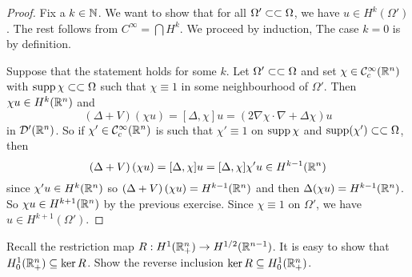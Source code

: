 \begin{proof}
  Fix a $k\in\mathbb{N}$.
  We want to show that for all $\Omega'\subset\subset\Omega$, we have $u\in H^k(\Omega')$.
  The rest follows from $C^\infty=\bigcap H^k$.
  We proceed by induction,
  The case $k=0$ is by definition.

  Suppose that the statement holds for some $k$.
  Let $\Omega'\subset\subset\Omega$ and set $\chi\in\mathcal{C}_c^\infty(\mathbb{R}^n)$ with $\operatorname{supp}\chi\subset\subset\Omega$ such that $\chi\equiv1$ in some neighbourhood of $\Omega'$.
  Then $\chi u\in H^k(\mathbb{R}^n)$ and
  \[ \left( \Delta+V \right)(\chi u) = [\Delta,\chi]u = \left( 2\nabla\chi\cdot\nabla+\Delta\chi \right)u \]
  in $\mathcal{D}'(\mathbb{R}^n)$.
  So if $\chi'\in\mathcal{C}_c^\infty(\mathbb{R}^n)$ is such that $\chi'\equiv1$ on $\operatorname{supp}\chi$ and $\operatorname{supp}(\chi')\subset\subset\Omega$, then
  \[ \left( \Delta+V \right)(\chi u) = [\Delta,\chi]u = [\Delta,\chi]\chi'u \in H^{k-1}(\mathbb{R}^n) \]
  since $\chi'u\in H^k(\mathbb{R}^n)$ so $\left( \Delta+V \right)(\chi u)= H^{k-1}(\mathbb{R}^n)$ and then $\Delta(\chi u)= H^{k-1}(\mathbb{R}^n)$.
  So $\chi u\in H^{k+1}(\mathbb{R}^n)$ by the previous exercise.
  Since $\chi\equiv1$ on $\Omega'$, we have $u\in H^{k+1}(\Omega')$.
\end{proof}

\begin{exer}
  Recall the restriction map $R: H^1(\mathbb{R}_+^n) \to H^{1/2}(\mathbb{R}^{n-1})$.
  It is easy to show that $H_0^1(\mathbb{R}_+^n)\subseteq\ker R$.
  Show the reverse inclusion $\ker R\subseteq H_0^1(\mathbb{R}_+^n)$.
\end{exer}

